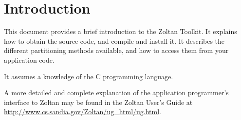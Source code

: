 %
%
\chapter{Introduction}

This document provides a brief introduction to the Zoltan Toolkit.
It explains how to obtain the source code, and compile and install it.
It describes the different partitioning methods available, and how
to access them from your application code.

It assumes a knowledge of the C programming language.

A more detailed and complete explanation of the application
programmer's interface to Zoltan may be found 
in the Zoltan User's Guide at
\url{http://www.cs.sandia.gov/Zoltan/ug_html/ug.html}.

